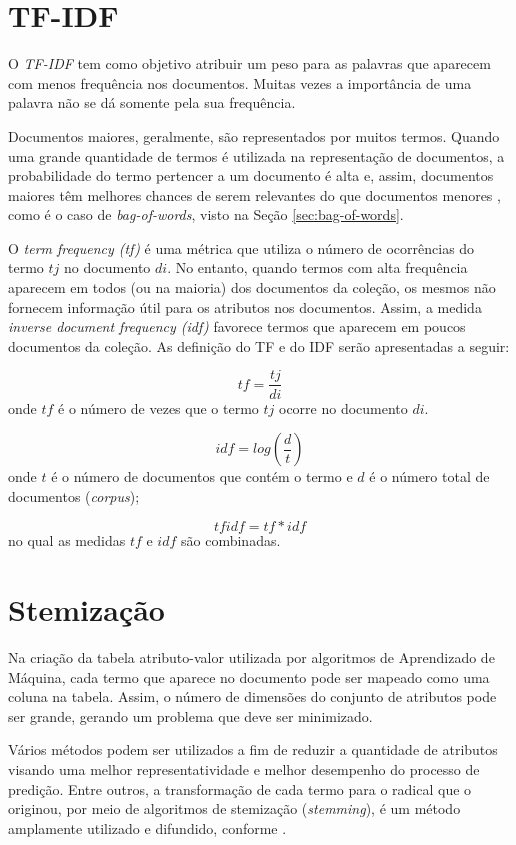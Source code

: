 \section{TF-IDF}\label{sec:tfidf}
O \textit{TF-IDF} tem como objetivo atribuir um peso para as palavras que aparecem com menos frequência nos documentos. Muitas vezes a importância de uma palavra não se dá somente pela sua frequência. 

Documentos maiores, geralmente, são representados por muitos termos. Quando uma grande quantidade de termos é utilizada na representação de documentos, a probabilidade do termo pertencer a um documento é alta e, assim, documentos maiores têm melhores chances de serem relevantes do que documentos menores \cite{tfidf-martins2003metodologia}, como é o caso de \textit{bag-of-words}, visto na Seção \ref{sec:bag-of-words}.

O \textit{term frequency (tf)} é uma métrica que utiliza o número de ocorrências do termo $tj$ no documento $di$. No entanto, quando termos com alta frequência aparecem em todos (ou na maioria) dos documentos da coleção, os mesmos não fornecem informação útil para os atributos nos documentos. Assim, a medida \textit{inverse document frequency (idf)} favorece termos que aparecem em poucos documentos da coleção. As definição do TF e do IDF serão apresentadas a seguir:

\[ tf = \frac{tj}{di} \]
onde $tf$ é o número de vezes que o termo $tj$ ocorre no documento $di$.

\[ idf = log(\frac{d}{t}) \]
onde $t$ é o número de documentos que contém o termo e $d$ é o número total de documentos (\textit{corpus});

\[ tfidf = tf * idf\]
no qual as medidas $tf$ e $idf$ são combinadas.

\section{Stemização}\label{sec:stem}
Na criação da tabela atributo-valor utilizada por algoritmos de Aprendizado de Máquina, cada termo que aparece no documento pode ser mapeado como uma coluna na tabela. Assim, o número de dimensões do conjunto de atributos pode ser grande, gerando  um problema que deve ser minimizado. 

Vários métodos podem ser utilizados a fim de reduzir a quantidade de atributos visando uma melhor representatividade e melhor desempenho do processo de predição. Entre outros, a transformação de cada termo para o radical que o originou, por meio de algoritmos de stemização (\textit{stemming}), é um método amplamente utilizado e difundido, conforme \cite{tfidf-martins2003metodologia}.

